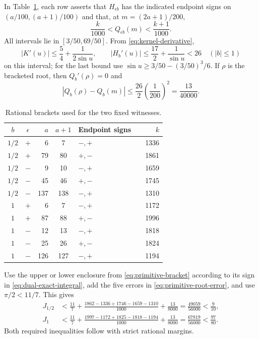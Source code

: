 \documentclass[11pt,reqno]{amsart}
\numberwithin{equation}{section}
\theoremstyle{definition}
\theoremstyle{remark}
\begin{document}
In Table~\ref{tab:fixed-dual-data}, each row asserts that $H_{\epsilon b}$ has the indicated endpoint signs on $(a/100,(a+1)/100)$ and that, at $m=(2a+1)/200$,
\begin{equation}\label{eq:primitive-bracket}
 \frac{k}{1000}<Q_{\epsilon b}(m)<\frac{k+1}{1000}.
\end{equation}
All intervals lie in $[3/50,69/50]$. From \eqref{eq:kernel-derivative},
\[
 |K'(u)|\le\frac54+\frac1{2\sin u},\qquad
 |H_b'(u)|\le\frac{17}{2}+\frac1{\sin u}<26\quad(|b|\le1)
\]
on this interval; for the last bound use $\sin u\ge3/50-(3/50)^3/6$. If $\rho$ is the bracketed root, then $Q_b'(\rho)=0$ and
\begin{equation}\label{eq:primitive-root-error}
 |Q_b(\rho)-Q_b(m)|\le\frac{26}{2}\left(\frac1{200}\right)^2
 =\frac{13}{40000}.
\end{equation}

\begin{table}[htbp]
\centering
\caption{Rational brackets used for the two fixed witnesses.}\label{tab:fixed-dual-data}
\begin{tabular}{@{}ccrclcr@{}}
\toprule
$b$ & $\epsilon$ & $a$ & $a+1$ & Endpoint signs & & $k$\\
\midrule
$1/2$ & $+$ & 6 & 7 & $-,+$ && 1336\\
$1/2$ & $+$ & 79 & 80 & $+,-$ && 1861\\
$1/2$ & $-$ & 9 & 10 & $-,+$ && 1659\\
$1/2$ & $-$ & 45 & 46 & $+,-$ && 1745\\
$1/2$ & $-$ & 137 & 138 & $-,+$ && 1310\\
\addlinespace
$1$ & $+$ & 6 & 7 & $-,+$ && 1172\\
$1$ & $+$ & 87 & 88 & $+,-$ && 1996\\
$1$ & $-$ & 12 & 13 & $-,+$ && 1818\\
$1$ & $-$ & 25 & 26 & $+,-$ && 1824\\
$1$ & $-$ & 126 & 127 & $-,+$ && 1194\\
\bottomrule
\end{tabular}
\end{table}

Use the upper or lower enclosure from \eqref{eq:primitive-bracket} according to its sign in \eqref{eq:dual-exact-integral}, add the five errors in \eqref{eq:primitive-root-error}, and use $\pi/2<11/7$. This gives
\begin{align}
 J_{1/2}
 &<\frac{11}{7}+\frac{1862-1336+1746-1659-1310}{1000}
       +\frac{13}{8000}
 =\frac{49059}{56000}<\frac9{10},\label{eq:Jhalf-bound}\\
 J_1
 &<\frac{11}{7}+\frac{1997-1172+1825-1818-1194}{1000}
       +\frac{13}{8000}
 =\frac{67819}{56000}<\frac{97}{80}.
 \label{eq:Jone-bound}
\end{align}
Both required inequalities follow with strict rational margins.
\end{document}
